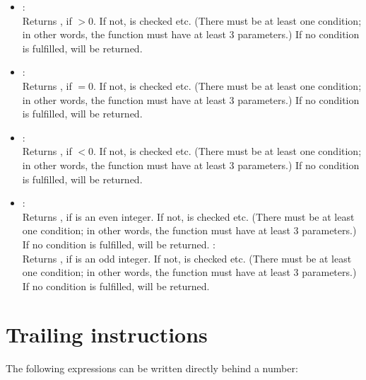 \begin{itemize}
\item
{}:\\
Returns , if $>0$. If not,  is checked etc.
(There must be at least one condition; in other words, the function must have at least 3 parameters.)
If no condition is fulfilled,  will be returned.
\item
{}:\\
Returns , if $=0$. If not,  is checked etc.
(There must be at least one condition; in other words, the function must have at least 3 parameters.)
If no condition is fulfilled,  will be returned.
\item
{}:\\
Returns , if $<0$. If not,  is checked etc.
(There must be at least one condition; in other words, the function must have at least 3 parameters.)
If no condition is fulfilled,  will be returned.
\item
{}:\\
Returns , if  is an even integer. If not,  is checked etc.
(There must be at least one condition; in other words, the function must have at least 3 parameters.)
If no condition is fulfilled,  will be returned.
:\\
Returns , if  is an odd integer. If not,  is checked etc.
(There must be at least one condition; in other words, the function must have at least 3 parameters.)
If no condition is fulfilled,  will be returned.
\end{itemize}



\chapter{Trailing instructions}

The following expressions can be written directly behind a number:

